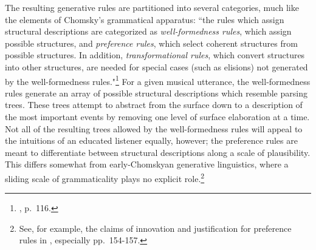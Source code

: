 The resulting generative rules are partitioned into several categories, much like the elements of Chomsky's grammatical apparatus:  ``the rules which assign structural descriptions are categorized as \emph{well-formedness rules}, which assign possible structures, and \emph{preference rules}, which select coherent structures from possible structures.  In addition, \emph{transformational rules}, which convert structures into other structures, are needed for special cases (such as elisions) not generated by the well-formedness rules."\footnote{\cite{lj1977}, p.\ 116.}  For a given musical utterance, the well-formedness rules generate an array of possible structural descriptions which resemble parsing trees.  These trees attempt to abstract from the surface down to a description of the most important events by removing one level of surface elaboration at a time.  Not all of the resulting trees allowed by the well-formedness rules will appeal to the intuitions of an educated listener equally, however; the preference rules are meant to differentiate between structural descriptions along a scale of plausibility.  This differs somewhat from early-Chomskyan generative linguistics, where a sliding scale of grammaticality plays no explicit role.\footnote{See, for example, the claims of innovation and justification for preference rules in \cite{lj1983}, especially pp.\ 154-157.}

